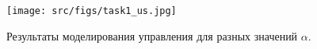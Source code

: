 \begin{figure}[ht!]
        \centering
        \texttt{[image: src/figs/task1\_us.jpg]}
        \caption{Результаты моделирования управления для разных значений \(\alpha\).}
        \label{fig:task1_us}
\end{figure}



\FloatBarrier
